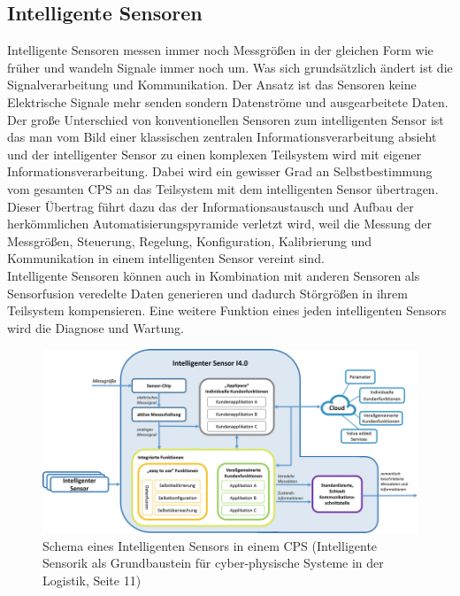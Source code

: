 \documentclass[a4paper,12pt]{scrartcl}
\begin{document}
\subsection{Intelligente Sensoren}
Intelligente Sensoren messen immer noch Messgrößen in der gleichen Form wie früher und wandeln Signale immer noch um. Was sich grundsätzlich ändert ist die Signalverarbeitung und Kommunikation. Der Ansatz ist das Sensoren keine Elektrische Signale mehr senden sondern Datenströme und ausgearbeitete Daten.\\
Der große Unterschied von konventionellen Sensoren zum intelligenten Sensor ist das man vom Bild einer klassischen zentralen Informationsverarbeitung absieht und der intelligenter Sensor zu einen komplexen Teilsystem wird mit eigener Informationsverarbeitung.
Dabei wird ein gewisser Grad an Selbstbestimmung vom gesamten CPS an das Teilsystem mit dem intelligenten Sensor übertragen. Dieser Übertrag führt dazu das der Informationsaustausch und Aufbau der herkömmlichen Automatisierungspyramide verletzt wird, weil die Messung der Messgrößen, Steuerung,  Regelung, Konfiguration, Kalibrierung und Kommunikation in einem intelligenten Sensor vereint sind.\\
Intelligente Sensoren können auch in Kombination mit anderen Sensoren als Sensorfusion veredelte Daten generieren und dadurch Störgrößen in ihrem Teilsystem kompensieren. Eine weitere Funktion eines jeden intelligenten Sensors wird die Diagnose und Wartung.\cite[Seite 9 ff.]{Furstenberg.2016}
\vspace{0.5cm}
\begin{figure}[H]
\centering
\includegraphics[scale=0.9]{picture/IntelligenterSensorSchema}
  \caption{Schema eines Intelligenten Sensors in einem CPS (Intelligente Sensorik als Grundbaustein für cyber-physische Systeme in der Logistik, Seite 11)}
 \label{fig:Schema eines Intelligenten Sensors in einem CPS } 
\end{figure}
\end{document}
